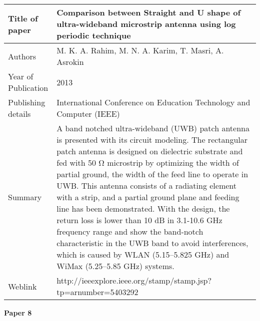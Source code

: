 		  \begin{center}
		  	\begin{table}[H]
		  		\centering
		  		\begin{tabular}{ |l|p{11cm}| }
		  			\hline
		  			Title of paper & Comparison between Straight and U shape of ultra-wideband microstrip antenna using log periodic technique  \\
		  			\hline
		  			Authors & M. K. A. Rahim, M. N. A. Karim, T. Masri, A. Asrokin \\
		  			\hline
		  			Year of Publication & 2013 \\
		  			\hline
		  			Publishing details & International Conference on Education Technology and Computer (IEEE) \\ \hline
		  			Summary & A band notched ultra-wideband (UWB) patch antenna is presented with its circuit modeling. The rectangular patch antenna is designed on dielectric substrate and fed with 50 Ω microstrip by optimizing the width of partial ground, the width of the feed line to operate in UWB. This antenna consists of a radiating element with a strip, and a partial ground plane and feeding line has been demonstrated. With the design, the return loss is lower than 10 dB in 3.1-10.6 GHz frequency range and show the band-notch characteristic in the UWB band to avoid interferences, which is caused by WLAN (5.15–5.825 GHz) and WiMax (5.25–5.85 GHz) systems. \\
		  			\hline
		  			Weblink & http://ieeexplore.ieee.org/stamp/stamp.jsp?tp=arnumber=5403292 \\
		  			\hline			 
		  		\end{tabular}		
		  		
		  	\end{table}
		  \end{center} 
				 
			\begin{flushleft}
				\textbf{Paper 8}
			\end{flushleft}
			

